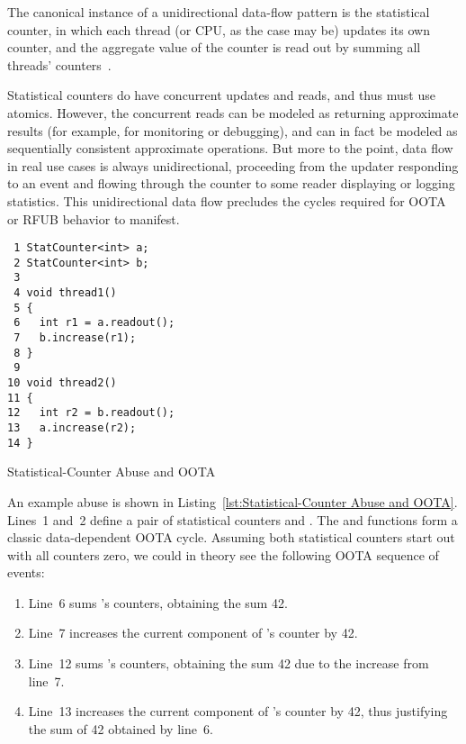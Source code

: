 \documentclass[10]{article}
\begin{document}
The canonical instance of a unidirectional data-flow pattern is the
statistical counter, in which each thread (or CPU, as the case may be)
updates its own counter, and the aggregate value of the counter is read
out by summing all threads'
counters~\cite[Section 5.2]{McKenney2018ParallelProgramming-2018-12-08a}.

Statistical counters do have concurrent updates and reads, and thus must
use atomics.
However, the concurrent reads can be modeled as returning approximate
results (for example, for monitoring or debugging), and can in fact be
modeled as sequentially consistent approximate operations.
But more to the point, data flow in real use cases is always
unidirectional, proceeding from the updater responding to an event
and flowing through the counter to some reader displaying or logging
statistics.
This unidirectional data flow precludes the cycles required for OOTA or
RFUB behavior to manifest.

\begin{listing}[tbp]
\begin{verbatim}
 1 StatCounter<int> a;
 2 StatCounter<int> b;
 3
 4 void thread1()
 5 {
 6   int r1 = a.readout();
 7   b.increase(r1);
 8 }
 9
10 void thread2()
11 {
12   int r2 = b.readout();
13   a.increase(r2);
14 }
\end{verbatim}
\caption{Statistical-Counter Abuse and OOTA}
\label{lst:Statistical-Counter Abuse and OOTA}
\end{listing}

An example abuse is shown in
Listing~\ref{lst:Statistical-Counter Abuse and OOTA}.
Lines~1 and~2 define a pair of statistical counters  and .
The  and  functions form a classic
data-dependent OOTA cycle.
Assuming both statistical counters start out with all counters zero,
we could in theory see the following OOTA sequence of events:

\begin{enumerate}
\item	Line~6 sums 's counters, obtaining the sum 42.
\item	Line~7 increases the current component of 's counter by 42.
\item	Line~12 sums 's counters, obtaining the sum 42 due to the
	increase from line~7.
\item	Line~13 increases the current component of 's counter by 42,
	thus justifying the sum of 42 obtained by line~6.
\end{enumerate}
\end{document}
